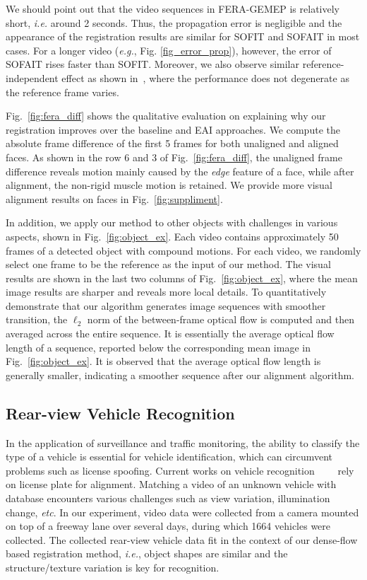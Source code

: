 \documentclass[10pt,journal]{IEEEtran}
\begin{document}
We should point out that the video sequences in FERA-GEMEP is relatively short, \textit{i.e.} around 2 seconds. Thus, the propagation error is negligible and the appearance of the registration results are similar for SOFIT and SOFAIT in most cases. For a longer video (\textit{e.g.}, Fig. \ref{fig_error_prop}), however, the error of SOFAIT rises faster than SOFIT. Moreover, we also observe similar reference-independent effect as shown in~\cite{Yang_FG13}, where the performance does not degenerate as the reference frame varies. 

Fig.~\ref{fig:fera_diff} shows the qualitative evaluation on explaining why our registration improves over the baseline and EAI approaches. We compute the absolute frame difference of the first 5 frames for both unaligned and aligned faces. As shown in the row 6 and 3 of Fig.~\ref{fig:fera_diff}, the unaligned frame difference reveals motion mainly caused by the \textit{edge} feature of a face, while after alignment, the non-rigid muscle motion is retained. We provide more visual alignment results on faces in Fig.~\ref{fig:suppliment}.

In addition, we apply our method to other objects with challenges in various aspects, shown in Fig.~\ref{fig:object_ex}. Each video contains approximately 50 frames of a detected object with compound motions. For each video, we randomly select one frame to be the reference as the input of our method. The visual results are shown in the last two columns of Fig.~\ref{fig:object_ex}, where the mean image results are sharper and reveals more local details. To quantitatively demonstrate that our algorithm generates image sequences with smoother transition, the $\ell_2$ norm of the between-frame optical flow is computed and then averaged across the entire sequence. It is essentially the average optical flow length of a sequence, reported below the corresponding mean image in Fig.~\ref{fig:object_ex}. It is observed that the average optical flow length is generally smaller, indicating a smoother sequence after our alignment algorithm.



\subsection{Rear-view Vehicle Recognition}


In the application of surveillance and traffic monitoring, the ability to classify the type of a vehicle is essential for vehicle identification, which can circumvent problems such as license spoofing. Current works on vehicle recognition~\cite{Petrovic04}~\cite{Negri06}~\cite{Zafar09}~\cite{Pearce11} rely on license plate for alignment. Matching a video of an unknown vehicle with database encounters various challenges such as view variation, illumination change, \textit{etc}. In our experiment, video data were collected from a camera mounted on top of a freeway lane over several days, during which 1664 vehicles were collected. The collected rear-view vehicle data fit in the context of our dense-flow based registration method, \textit{i.e.}, object shapes are similar and the structure/texture variation is key for recognition. 
\end{document}
